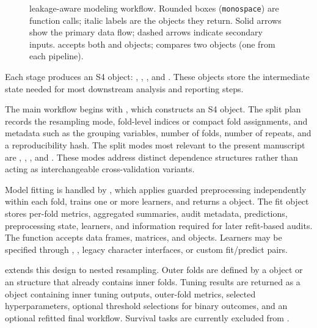 \documentclass[article,shortnames]{jss}
\begin{document}
\begin{figure}[tbp]
\caption{ leakage-aware modeling workflow. Rounded boxes
(\texttt{monospace}) are function calls; italic labels are the objects
they return. Solid arrows show the primary data flow; dashed arrows
indicate secondary inputs.  accepts both
 and  objects; 
compares two  objects (one from each pipeline).}
\label{fig:workflow}
\end{figure}

Each stage produces an S4 object: , ,
, and . These objects store the intermediate state needed for most downstream analysis and reporting steps.

The main workflow begins with , which constructs an
S4  object. The split plan records the resampling mode,
fold-level indices or compact fold assignments, and metadata such as the
grouping variables, number of folds, number of repeats, and a reproducibility
hash. The split modes most relevant to the present manuscript are
, ,
, and . These modes address distinct
dependence structures rather than acting as interchangeable cross-validation
variants.

Model fitting is handled by , which applies guarded
preprocessing independently within each fold, trains one or more learners, and
returns a  object. The fit object stores per-fold metrics,
aggregated summaries, audit metadata, predictions, preprocessing state,
learners, and information required for later refit-based audits. The function
accepts data frames, matrices, and  objects.
Learners may be specified through , , legacy
character interfaces, or custom fit/predict pairs.

 extends this design to nested resampling. Outer folds
are defined by a  object or an  structure
that already contains inner folds. Tuning results are returned as a
 object containing inner tuning outputs, outer-fold metrics,
selected hyperparameters, optional threshold selections for binary outcomes, and
an optional refitted final workflow. Survival tasks are currently excluded from
.
\end{document}
